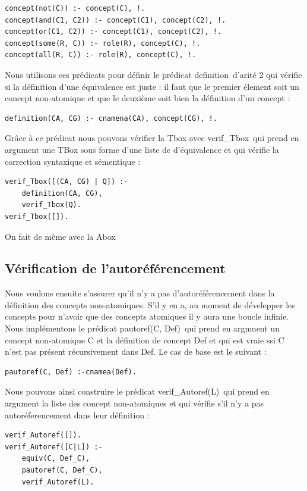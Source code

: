 \documentclass[12pt]{article}
\begin{document}
\begin{verbatim}
concept(not(C)) :- concept(C), !.
concept(and(C1, C2)) :- concept(C1), concept(C2), !.
concept(or(C1, C2)) :- concept(C1), concept(C2), !.
concept(some(R, C)) :- role(R), concept(C), !.
concept(all(R, C)) :- role(R), concept(C), !.
\end{verbatim}

Nous utilisons ces prédicats pour définir le prédicat \color{blue}definition\color{black}\ d'arité 2 qui vérifie si la définition d'une équivalence est juste : il faut que le premier élement soit un concept non-atomique et que le deuxième soit bien la définition d'un concept :
\begin{verbatim}
definition(CA, CG) :- cnamena(CA), concept(CG), !.
\end{verbatim}

Grâce à ce prédicat nous pouvons vérifier la Tbox avec \color{blue}verif\_Tbox\color{black}\ qui prend en argument une TBox sous forme d'une liste de d'équivalence et qui vérifie la correction syntaxique et sémentique : 
\begin{verbatim}
verif_Tbox([(CA, CG) | Q]) :- 
    definition(CA, CG), 
    verif_Tbox(Q).
verif_Tbox([]).
\end{verbatim}
On fait de même avec la Abox
\subsection{Vérification de l'autoréférencement}
Nous voulons ensuite s'assurer qu'il n'y a pas d'autoréférencement dans la définition des concepts non-atomiques. S'il y en a, au moment de dévelepper les concepts pour n'avoir que des concepts atomiques il y aura une boucle infinie. Nous implémentons le prédicat \color{blue}pautoref(C, Def)\color{black}\ qui prend en argmuent un concept non-atomique C et la définition de concept Def et qui est vraie ssi C n'est pas présent récursivement dans Def. Le cas de base est le suivant :
\begin{verbatim}
pautoref(C, Def) :-cnamea(Def).
\end{verbatim}

Nous pouvons ainsi construire le prédicat \color{blue}verif\_Autoref(L)\color{black}\ qui prend en argument la liste des concept non-atomiques et qui vérifie s'il n'y a pas autoréferencement dans leur définition : 
\begin{verbatim}
verif_Autoref([]).
verif_Autoref([C|L]) :-
	equiv(C, Def_C),
	pautoref(C, Def_C),
	verif_Autoref(L).
\end{verbatim}
\end{document}

